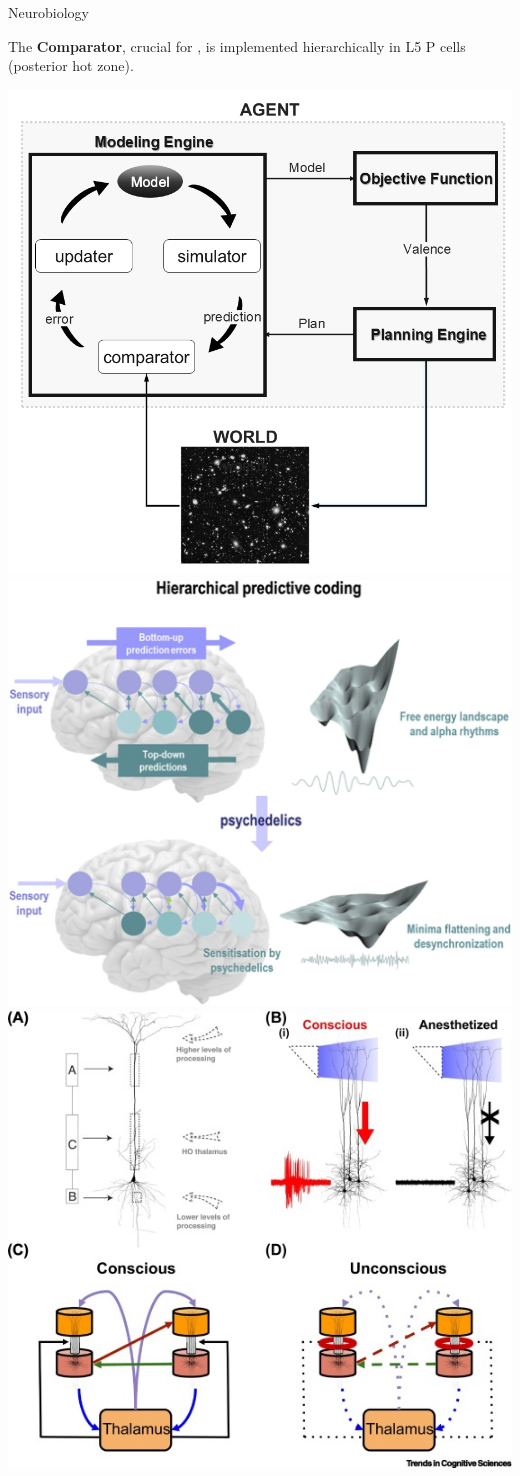 \begin{frame}[label=ladila]{Neurobiology}

The \textbf{Comparator}, crucial for \SEP, is implemented hierarchically in L5 P cells\citep{CarhartHarris2019,Aru2020} (posterior hot zone). \vspace{0.5cm}

 
  \includegraphics[height=4.cm]{img/Figure1_StructuredDynamics.png}
\includegraphics[height=4.cm]{img/F1.large.jpg}
\includegraphics[height=4.cm]{img/gr2.jpeg}
\end{frame}



